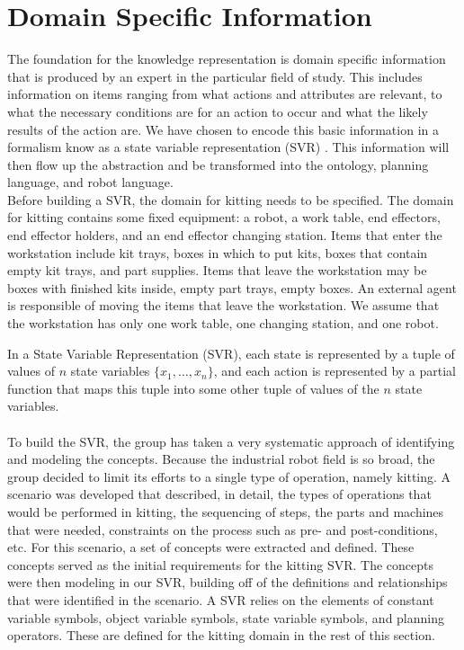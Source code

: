 \section{Domain Specific Information}\label{kitting_domain}

The foundation for the knowledge representation is domain specific information that is produced by an expert in the particular field of study. This includes
information on items ranging from what actions and attributes are relevant, to what the necessary conditions are for an action to occur and what the
likely results of the action are. We have chosen to encode this basic information in a formalism know as a state variable representation (SVR) \cite{NAU.2004}.
This information will then flow up the abstraction and be transformed into the ontology, planning language, and robot language.\\
Before building a SVR, the domain for kitting needs to be specified. The domain for kitting contains some fixed equipment: a robot, a work table, end effectors, end effector holders, and an end effector changing station. Items that enter the workstation include kit trays, boxes in which to put kits, boxes that contain empty kit trays, and part supplies. Items that leave the workstation may be boxes with finished kits inside, empty part trays, empty boxes. An external agent is responsible of moving the items that leave the workstation. We assume that the workstation has only one work table, one changing station, and one robot.



In a State Variable Representation (SVR), each state is represented by a tuple of values of $n$ state variables $\lbrace x_1,\dots,x_n\rbrace$, and each action is represented by a partial function that maps this tuple into some other tuple of values of the $n$ state variables.\\ \\
To build the SVR, the group has taken a very systematic approach of identifying and modeling the concepts. Because the industrial robot field is so broad, the group decided to limit its efforts to a single type of operation, namely kitting. A scenario was developed that described, in detail, the types of operations that would be performed in kitting, the sequencing of steps, the parts and machines that were needed, constraints on the process such as pre- and post-conditions, etc. For this scenario, a set of concepts were extracted and defined. These concepts served as the initial requirements for the kitting SVR. The concepts were then modeling in our SVR, building off of the definitions and relationships that were identified in the scenario. A SVR relies on the elements of constant variable symbols, object variable symbols, state variable symbols, and planning operators. These are defined for the kitting domain in the rest of this section.


